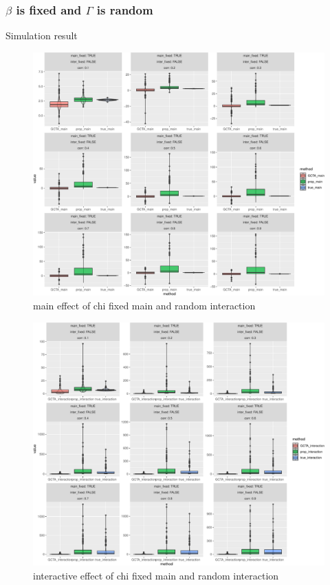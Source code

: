\documentclass[]{article}
\begin{document}
\clearpage

\subsubsection{\texorpdfstring{\(\beta\) is fixed and \(\Gamma\) is
random}{\textbackslash{}beta is fixed and \textbackslash{}Gamma is random}}\label{beta-is-fixed-and-gamma-is-random-1}

Simulation result

\begin{figure}
\centering
\includegraphics{Simulation_report_files/figure-latex/main_fixed_random_chi-1.pdf}
\caption{main effect of chi fixed main and random interaction}
\end{figure}

\begin{figure}
\centering
\includegraphics{Simulation_report_files/figure-latex/inter_fixed_random_chi-1.pdf}
\caption{interactive effect of chi fixed main and random interaction}
\end{figure}
\end{document}
